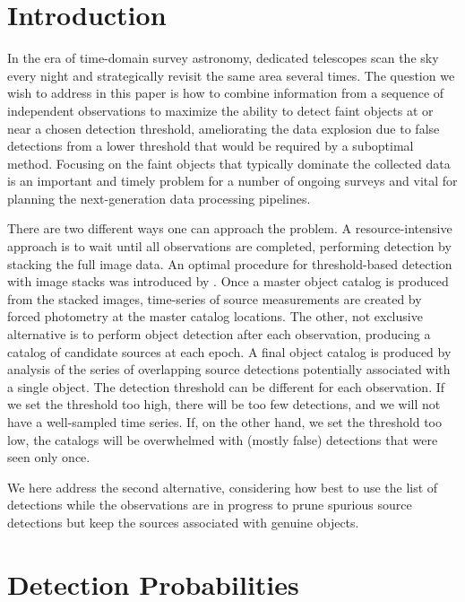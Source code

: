 \documentclass[twocolumn]{emulateapj}
\begin{document}
\section{Introduction}
\label{sec:intro}
\noindent
%
In the era of time-domain survey astronomy, dedicated telescopes scan the sky every night and strategically revisit the same area several times. 
The question we wish to address in this paper is how to combine information from a sequence of independent observations to maximize the ability to detect faint objects at or near a chosen detection threshold, ameliorating the data explosion due to false detections from a lower threshold that would be required by a suboptimal method.
Focusing on the faint objects that typically dominate the collected data is an important and timely problem for a number of ongoing surveys and vital for planning the next-generation data processing pipelines.

There are two different ways one can approach the problem. 
A resource-intensive approach is to wait until all observations are completed, performing detection by stacking the full image data.
An optimal procedure for threshold-based detection with image stacks was introduced by \citet{chisq}.
Once a master object catalog is produced from the stacked images, time-series of source measurements are created by forced photometry at the master catalog locations.
%
The other, not exclusive alternative is to perform object detection after each observation, producing a catalog of candidate sources at each epoch.
A final object catalog is produced by analysis of the series of overlapping source detections potentially associated with a single object. 
The detection threshold can be different for each observation. 
If we set the threshold too high, there will be too few detections, and we will not have a well-sampled time series. 
If, on the other hand, we set the threshold too low, the catalogs will be overwhelmed with (mostly false) detections that were seen only once.

We here address the second alternative, considering how best to use the list of detections while the observations are in progress to prune spurious source detections but keep the sources associated with genuine objects.


\section{Detection Probabilities} 
\label{sec:det}
\end{document}
